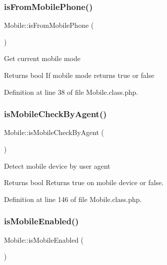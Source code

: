 \subsubsection{\texorpdfstring{is\+From\+Mobile\+Phone()}{isFromMobilePhone()}}
{\footnotesize\ttfamily Mobile\+::is\+From\+Mobile\+Phone (\begin{DoxyParamCaption}{ }\end{DoxyParamCaption})}

Get current mobile mode

\begin{DoxyReturn}{Returns}
bool If mobile mode returns true or false 
\end{DoxyReturn}


Definition at line 38 of file Mobile.\+class.\+php.

\mbox{\label{classMobile_a58dde3c19008fb6fff64140c0b34a5ee}} 
\subsubsection{\texorpdfstring{is\+Mobile\+Check\+By\+Agent()}{isMobileCheckByAgent()}}
{\footnotesize\ttfamily Mobile\+::is\+Mobile\+Check\+By\+Agent (\begin{DoxyParamCaption}{ }\end{DoxyParamCaption})}

Detect mobile device by user agent

\begin{DoxyReturn}{Returns}
bool Returns true on mobile device or false. 
\end{DoxyReturn}


Definition at line 146 of file Mobile.\+class.\+php.

\mbox{\label{classMobile_aadc14b13b20ae9dc9b4dd96a45e04a3d}} 
\subsubsection{\texorpdfstring{is\+Mobile\+Enabled()}{isMobileEnabled()}}
{\footnotesize\ttfamily Mobile\+::is\+Mobile\+Enabled (\begin{DoxyParamCaption}{ }\end{DoxyParamCaption})}



